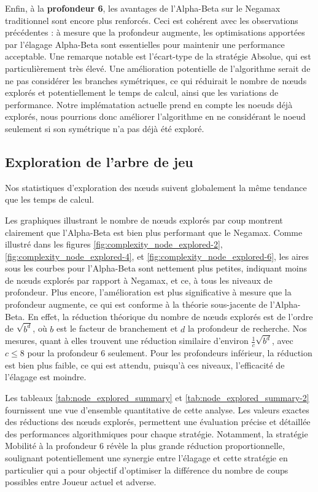 Enfin, à la \textbf{profondeur 6}, les avantages de l'Alpha-Beta sur le Negamax traditionnel sont encore plus renforcés. Ceci est cohérent avec les observations précédentes : à mesure que la profondeur augmente, les optimisations apportées par l'élagage Alpha-Beta sont essentielles pour maintenir une performance acceptable. Une remarque notable est l'écart-type de la stratégie Absolue, qui est particulièrement très élevé. Une amélioration potentielle de l'algorithme serait de ne pas considérer les branches symétriques, ce qui réduirait le nombre de nœuds explorés et potentiellement le temps de calcul, ainsi que les variations de performance. Notre implématation actuelle prend en compte les noeuds déjà explorés, nous pourrions donc améliorer l'algorithme en ne considérant le noeud seulement si son symétrique n'a pas déjà été exploré.


\subsection{Exploration de l'arbre de jeu}
Nos statistiques d'exploration des nœuds suivent globalement la même tendance que les temps de calcul.

Les graphiques illustrant le nombre de nœuds explorés par coup montrent clairement que l'Alpha-Beta est bien plus performant que le Negamax. Comme illustré dans les figures \ref{fig:complexity_node_explored-2}, \ref{fig:complexity_node_explored-4}, et \ref{fig:complexity_node_explored-6}, les aires sous les courbes pour l'Alpha-Beta sont nettement plus petites, indiquant moins de nœuds explorés par rapport à Negamax, et ce, à tous les niveaux de profondeur. Plus encore, l'amélioration est plus significative à mesure que la profondeur augmente, ce qui est conforme à la théorie sous-jacente de l'Alpha-Beta. En effet, la réduction théorique du nombre de nœuds explorés est de l'ordre de $\sqrt{b^d}$, où $b$ est le facteur de branchement et $d$ la profondeur de recherche. Nos mesures, quant à elles trouvent une réduction similaire d'environ $\frac{1}{c}\sqrt{b^d}$, avec $c\leq8$ pour la profondeur 6 seulement. Pour les profondeurs inférieur, la réduction est bien plus faible, ce qui est attendu, puisqu'à ces niveaux, l'efficacité de l'élagage est moindre.

Les tableaux \ref{tab:node_explored_summary} et \ref{tab:node_explored_summary-2} fournissent une vue d'ensemble quantitative de cette analyse. Les valeurs exactes des réductions des nœuds explorés, permettent une évaluation précise et détaillée des performances algorithmiques pour chaque stratégie. Notamment, la stratégie Mobilité à la profondeur 6 révèle la plus grande réduction proportionnelle, soulignant potentiellement une synergie entre l'élagage et cette stratégie en particulier qui a pour objectif d'optimiser la différence du nombre de coups possibles entre Joueur actuel et adverse.

